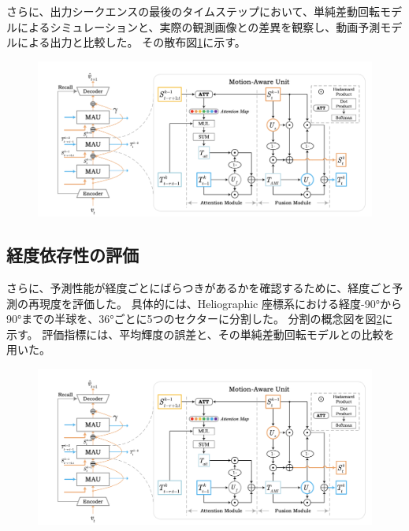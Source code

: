         さらに、出力シークエンスの最後のタイムステップにおいて、単純差動回転モデルによるシミュレーションと、実際の観測画像との差異を観察し、動画予測モデルによる出力と比較した。
        その散布図\ref{fig:exp1_sdr_scatter}に示す。
        
        \begin{figure}[h]
          \centering
          \includegraphics[width=150mm]{figures/mau.png}
          \caption{}
          \label{fig:exp1_sdr_scatter}
        \end{figure}

    \subsection{経度依存性の評価}
        さらに、予測性能が経度ごとにばらつきがあるかを確認するために、経度ごと予測の再現度を評価した。
        具体的には、Heliographic 座標系における経度-90°から90°までの半球を、36°ごとに5つのセクターに分割した。
        分割の概念図を図\ref{fig:exp1_longitude_division}に示す。
        評価指標には、平均輝度の誤差と、その単純差動回転モデルとの比較を用いた。
        
        \begin{figure}[h]
          \centering
          \includegraphics[width=150mm]{figures/mau.png}
          \caption{}
          \label{fig:exp1_longitude_division}
        \end{figure}

